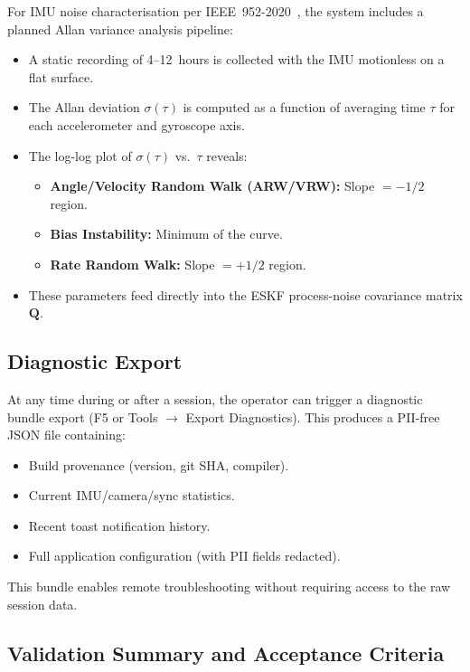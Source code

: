 For IMU noise characterisation per IEEE~952-2020~\cite{ieee952}, the system includes a planned Allan variance analysis pipeline:
\begin{itemize}[nosep]
  \item A static recording of 4--12~hours is collected with the IMU motionless on a flat surface.
  \item The Allan deviation $\sigma(\tau)$ is computed as a function of averaging time $\tau$ for each accelerometer and gyroscope axis.
  \item The log-log plot of $\sigma(\tau)$ vs.\ $\tau$ reveals:
  \begin{itemize}[nosep]
    \item \textbf{Angle/Velocity Random Walk (ARW/VRW):} Slope $= -1/2$ region.
    \item \textbf{Bias Instability:} Minimum of the curve.
    \item \textbf{Rate Random Walk:} Slope $= +1/2$ region.
  \end{itemize}
  \item These parameters feed directly into the ESKF process-noise covariance matrix $\mathbf{Q}$.
\end{itemize}


\subsection{Diagnostic Export}

At any time during or after a session, the operator can trigger a diagnostic bundle export (F5 or Tools $\rightarrow$ Export Diagnostics).
This produces a PII-free JSON file containing:
\begin{itemize}[nosep]
  \item Build provenance (version, git SHA, compiler).
  \item Current IMU/camera/sync statistics.
  \item Recent toast notification history.
  \item Full application configuration (with PII fields redacted).
\end{itemize}

This bundle enables remote troubleshooting without requiring access to the raw session data.


\subsection{Validation Summary and Acceptance Criteria}

